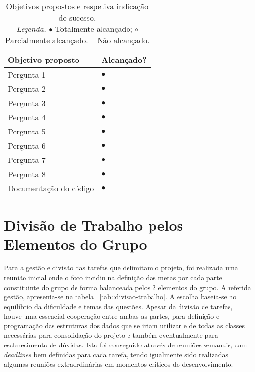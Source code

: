 \begin{table}[!htbp]
	\centering
	\begin{tabular}{p{} >{\centering\let\newline\\\arraybackslash\hspace{0pt}}m{}}
		\toprule
		{\bfseries Objetivo proposto} & {\bfseries Alcançado?} \\
		\midrule
		Pergunta 1 & $\bullet$             \\
		Pergunta 2 & $\bullet$             \\
		Pergunta 3 & $\bullet$             \\
		Pergunta 4 & $\bullet$             \\
		Pergunta 5 & $\bullet$             \\
		Pergunta 6 & $\bullet$             \\
		Pergunta 7 & $\bullet$             \\
		Pergunta 8 & $\bullet$             \\
		Documentação do código & $\bullet$ \\
		\bottomrule
	\end{tabular}
	\caption[Objetivos propostos vs. alcançados]{
		Objetivos propostos e respetiva indicação de sucesso.\\
		\textit{Legenda.} $\bullet$ Totalmente alcançado; $\circ$ Parcialmente alcançado. -- Não alcançado.
	}
	\label{tab::objetivos}
\end{table}


\section{Divisão de Trabalho pelos Elementos do Grupo}
\label{sec::reflexao:divisao}

Para a gestão e divisão das tarefas que delimitam o projeto, foi realizada uma reunião inicial onde o foco incidiu na definição das metas por cada parte constituinte do grupo de forma balanceada pelos 2 elementos do grupo. A referida gestão, apresenta-se na tabela ~\ref{tab::divisao-trabalho}. A escolha baseia-se no equilíbrio da dificuldade e temas das questões. Apesar da divisão de tarefas, houve uma essencial cooperação entre ambas as partes, para definição e programação das estruturas dos dados que se iriam utilizar e de todas as classes necessárias para consolidação do projeto e também eventualmente para esclarecimento de dúvidas. Isto foi conseguido através de reuniões semanais, com \textit{deadlines} bem definidas para cada tarefa, tendo igualmente sido realizadas algumas reuniões extraordinárias em momentos críticos do desenvolvimento.

